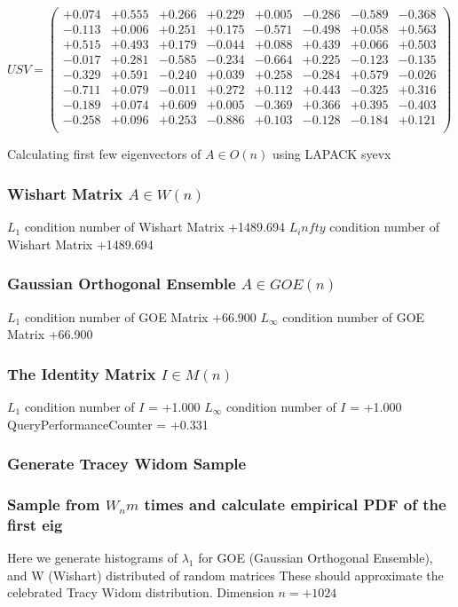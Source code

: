 \documentclass[9pt]{article}
\theoremstyle{plain}
\theoremstyle{definition}
\theoremstyle{remark}
\numberwithin{equation}{section}
\begin{document}
$U S V = \left(
\begin{array}{
cccccccc}
+0.074 & +0.555 & +0.266 & +0.229 & +0.005 & -0.286 & -0.589 & -0.368 \\
-0.113 & +0.006 & +0.251 & +0.175 & -0.571 & -0.498 & +0.058 & +0.563 \\
+0.515 & +0.493 & +0.179 & -0.044 & +0.088 & +0.439 & +0.066 & +0.503 \\
-0.017 & +0.281 & -0.585 & -0.234 & -0.664 & +0.225 & -0.123 & -0.135 \\
-0.329 & +0.591 & -0.240 & +0.039 & +0.258 & -0.284 & +0.579 & -0.026 \\
-0.711 & +0.079 & -0.011 & +0.272 & +0.112 & +0.443 & -0.325 & +0.316 \\
-0.189 & +0.074 & +0.609 & +0.005 & -0.369 & +0.366 & +0.395 & -0.403 \\
-0.258 & +0.096 & +0.253 & -0.886 & +0.103 & -0.128 & -0.184 & +0.121 \\
\end{array}
\right)$ \newline 

Calculating first few eigenvectors of $A \in O(n)$ using LAPACK syevx

\subsubsection{Wishart Matrix $A \in W(n)$}
$L_1$ condition number of Wishart Matrix +1489.694
$L_infty$ condition number of Wishart Matrix +1489.694
\subsubsection{Gaussian Orthogonal Ensemble $A \in GOE(n)$}
$L_1$ condition number of GOE Matrix +66.900
$L_\infty$ condition number of GOE Matrix +66.900
\subsubsection{The Identity Matrix $I \in M(n)$}
$L_1$ condition number of $I$ = +1.000
$L_\infty$ condition number of $I$ = +1.000
QueryPerformanceCounter  =  +0.331
\subsubsection{Generate Tracey Widom Sample}
\subsubsection{Sample from $W_n m$ times and calculate empirical PDF of the first eig}
Here we generate histograms of $\lambda_1$ for GOE (Gaussian Orthogonal Ensemble), and W (Wishart) 		 distributed of random matrices
These should approximate the celebrated Tracy Widom distribution.
Dimension $n = +1024$
\end{document}
